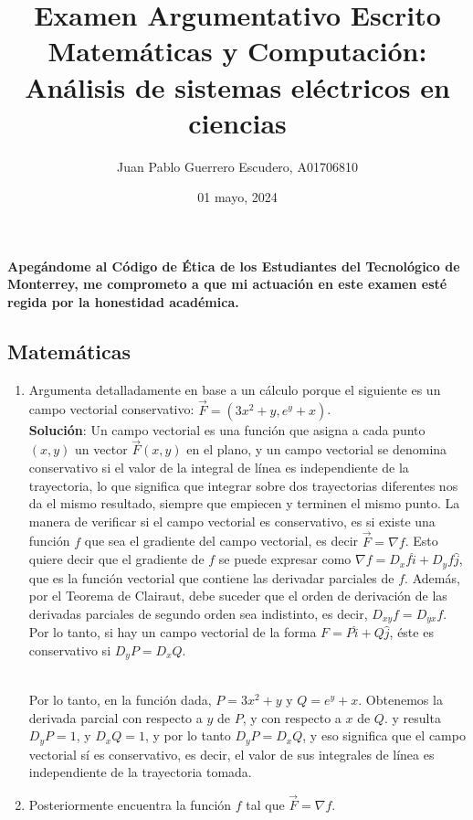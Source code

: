 \documentclass[12pt, letterpaper]{report}
\title{Examen Argumentativo Escrito Matemáticas y Computación: Análisis de sistemas eléctricos en ciencias}
\author{Juan Pablo Guerrero Escudero, A01706810}
\date{01 mayo, 2024}
\begin{document}
\maketitle
\textbf{Apegándome al Código de Ética de los Estudiantes del Tecnológico de Monterrey, me
comprometo a que mi actuación en este examen esté regida por la honestidad
académica.}
\subsection*{Matemáticas}
\begin{enumerate}
\item Argumenta detalladamente en base a un cálculo porque el siguiente es un campo vectorial
conservativo: $\vec{F} = (3x^2 + y, e^y + x)$. \\

\textbf{Solución}: Un campo vectorial es una función que asigna a cada punto $(x, y)$ un vector $\vec{F}(x, y)$ en el plano, y un campo vectorial 
se denomina conservativo si el valor de la integral de línea es independiente de la trayectoria, lo que significa que 
integrar sobre dos trayectorias diferentes nos da el mismo resultado, siempre que empiecen y terminen el mismo punto. La manera de verificar 
si el campo vectorial es conservativo, es si existe una función $f$ que sea el gradiente del campo vectorial, es decir $\vec{F} = \nabla f$. Esto
quiere decir que el gradiente de $f$ se puede expresar como $\nabla f = D_xf\hat{i} + D_yf\hat{j}$, que es la función vectorial 
que contiene las derivadar parciales de $f$. Además, por el Teorema de Clairaut, debe suceder que el orden de derivación 
de las derivadas parciales de segundo orden sea indistinto, es decir, $D_{xy}f = D_{yx}f$. Por lo tanto, si hay un campo vectorial 
de la forma $F = P\hat{i} + Q\hat{j}$, éste es conservativo si $D_yP = D_xQ$. \\ 

Por lo tanto, en la función dada, $P = 3x^2 + y$ y $Q = e^y+ x$. Obtenemos la derivada parcial con respecto a $y$ de $P$, y con respecto a 
$x$ de $Q$. y resulta $D_yP = 1$, y $D_xQ = 1$, y por lo tanto $D_yP = D_xQ$, y eso significa que el campo vectorial sí es conservativo, es decir, 
el valor de sus integrales de línea es independiente de la trayectoria tomada. 
\item Posteriormente encuentra la función $f$ tal que $\vec{F} = \nabla f$. \\ 


\end{enumerate}
\end{document}
